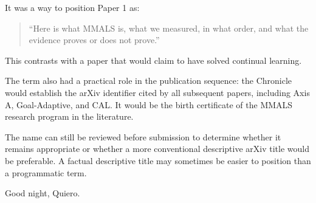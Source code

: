 It was a way to position Paper 1 as:

\begin{quote}
``Here is what MMALS is, what we measured, in what order, and what the evidence proves or does not prove.''
\end{quote}

This contrasts with a paper that would claim to have solved continual learning.

The term also had a practical role in the publication sequence: the Chronicle would establish the arXiv identifier cited by all subsequent papers, including Axis A, Goal-Adaptive, and CAL. It would be the birth certificate of the MMALS research program in the literature.

The name can still be reviewed before submission to determine whether it remains appropriate or whether a more conventional descriptive arXiv title would be preferable. A factual descriptive title may sometimes be easier to position than a programmatic term.

Good night, Quiero.

